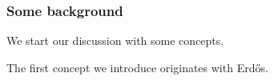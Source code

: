 \documentclass{beamer}
\begin{document}
\begin{frame}
\frametitle{Some background}

We start our discussion with some concepts.

\pause

The first concept we introduce originates with Erd\H os.
\end{frame}
\end{document}
